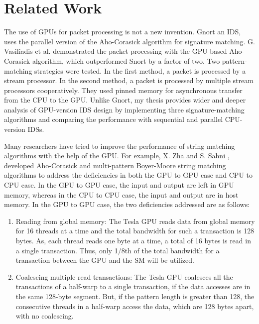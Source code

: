 \chapter{Related Work}

The use of GPUs for packet processing is not a new invention. Gnort \cite{bib10} an IDS, uses the parallel version of the Aho-Corasick algorithm \cite{bib6} for signature matching. G. Vasiliadis et al. \cite{bib10} demonstrated the packet processing with the GPU based Aho-Corasick algorithm, which outperformed Snort by a factor of two. Two pattern-matching strategies were tested. In the first method, a packet is processed by a stream processor. In the second method, a packet is processed by multiple stream processors cooperatively. They used pinned memory for asynchronous transfer from the CPU to the GPU. Unlike Gnort, my thesis provides wider and deeper analysis of GPU-version IDS design by implementing three signature-matching algorithms and comparing the performance with sequential and parallel CPU-version IDSs.

Many researchers have tried to improve the performance of string matching algorithms with the help of the GPU. For example, X. Zha and S. Sahni \cite{bib12}, developed Aho-Corasick and multi-pattern Boyer-Moore string matching algorithms to address the deficiencies in both the GPU to GPU case and CPU to CPU case. In the GPU to GPU case, the input and output are left in GPU memory, whereas in the CPU to CPU case, the input and output are in host memory. In the GPU to GPU case, the two deficiencies addressed are as follows:

\begin{enumerate}[leftmargin=*]
	\item
	Reading from global memory: The Tesla GPU reads data from global memory for 16 threads at a time and the total bandwidth for such a transaction is 128 bytes. As, each thread reads one byte at a time, a total of 16 bytes is read in a single transaction. Thus, only 1/8th of the total bandwidth for a transaction between the GPU and the SM will be utilized. 
	\item
	Coalescing multiple read transactions: The Tesla GPU coalesces all the transactions of a half-warp to a single transaction, if the data accesses are in the same 128-byte segment. But, if the pattern length is greater than 128, the consecutive threads in a half-warp access the data, which are 128 bytes apart, with no coalescing.
\end{enumerate}
\vspace{\topsep}

